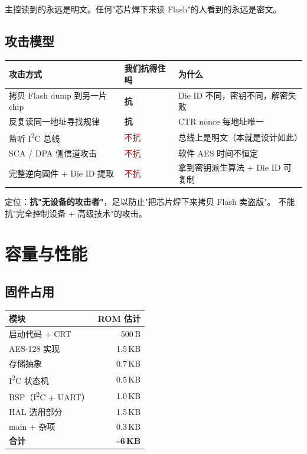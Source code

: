 \documentclass[UTF8,a4paper,11pt]{ctexart}
\begin{document}
主控读到的永远是明文。任何"芯片焊下来读 Flash"的人看到的永远是密文。

\subsection{攻击模型}

\begin{center}
\begin{tabular}{lll}
\toprule
\textbf{攻击方式} & \textbf{我们抗得住吗} & \textbf{为什么} \\
\midrule
拷贝 Flash dump 到另一片 chip & \textbf{抗} & Die ID 不同，密钥不同，解密失败 \\
反复读同一地址寻找规律     & \textbf{抗} & CTR nonce 每地址唯一 \\
监听 I\textsuperscript{2}C 总线        & \textcolor{red}{不抗} & 总线上是明文（本就是设计如此） \\
SCA / DPA 侧信道攻击      & \textcolor{red}{不抗} & 软件 AES 时间不恒定 \\
完整逆向固件 + Die ID 提取 & \textcolor{red}{不抗} & 拿到密钥派生算法 + Die ID 可复制 \\
\bottomrule
\end{tabular}
\end{center}

定位：\textbf{抗"无设备的攻击者"}，足以防止"把芯片焊下来拷贝 Flash 卖盗版"。
不能抗"完全控制设备 + 高级技术"的攻击。

\section{容量与性能}

\subsection{固件占用}

\begin{center}
\begin{tabular}{lr}
\toprule
\textbf{模块} & \textbf{ROM 估计} \\
\midrule
启动代码 + CRT  & 500\,B \\
AES-128 实现   & 1.5\,KB \\
存储抽象       & 0.7\,KB \\
I\textsuperscript{2}C 状态机 & 0.5\,KB \\
BSP（I\textsuperscript{2}C + UART） & 1.0\,KB \\
HAL 选用部分   & 1.5\,KB \\
main + 杂项    & 0.3\,KB \\
\midrule
\textbf{合计} & \textbf{\textasciitilde 6\,KB} \\
\bottomrule
\end{tabular}
\end{center}
\end{document}
